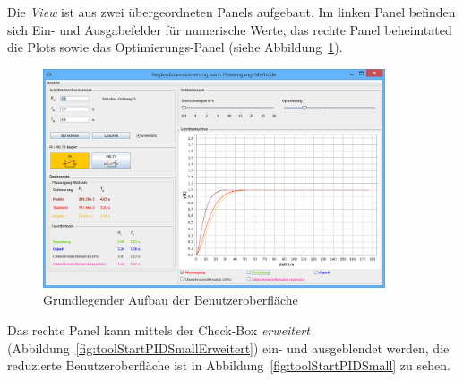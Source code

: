 Die  \emph{View} ist  aus  zwei \"ubergeordneten  Panels aufgebaut. Im  linken
Panel  befinden  sich  Ein-  und Ausgabefelder  f\"ur  numerische  Werte,  das
rechte  Panel  beheimtated  die  Plots  sowie  das  Optimierungs-Panel  (siehe
Abbildung~\ref{fig:toolStartPI}).

\begin{figure}[h!, width=\pagewidth]
    \centering
    \includegraphics[width=0.9\textwidth]{images/toolStartPI.jpg}
    \caption{Grundlegender Aufbau der Benutzeroberfl\"ache}
    \label{fig:toolStartPI}
\end{figure}

Das    rechte   Panel    kann   mittels    der   Check-Box    \emph{erweitert}
(Abbildung~\ref{fig:toolStartPIDSmallErweitert})    ein-   und    ausgeblendet
werden,       die      reduzierte       Benutzeroberfl\"ache      ist       in
Abbildung~\ref{fig:toolStartPIDSmall} zu sehen.


